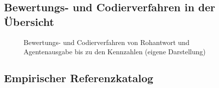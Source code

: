 \documentclass[
  10pt,
  ngerman,
  a4paper,
  toc=graduated,
  numbers=noenddot,
  headings=standardclasses,
  nonumberlist
]{scrartcl}
\begin{document}
\subsection{Bewertungs- und Codierverfahren in der Übersicht}
\label{anhang_codiergrafik}

\begin{figure}[H]
    \centering
    
    \caption{Bewertungs- und Codierverfahren von Rohantwort und Agentenausgabe bis zu den Kennzahlen (eigene Darstellung)}
    \label{fig:codierverfahren}
\end{figure}

\subsection{Empirischer Referenzkatalog}
\label{anhang_referenzkatalog}
\end{document}
